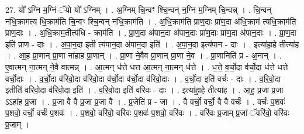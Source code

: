 \documentclass[17pt]{extarticle}
\begin{document}
27. यो᳚ ऽग्नि म॒ग्निं ॅयो यो᳚ ऽग्निम् । . अ॒ग्निम् चि॒न्वꣳ श्चि॒न्वन् न॒ग्नि म॒ग्निम् चि॒न्वन्न् । . चि॒न्वन् न॑धि॒क्राम॑त्य धि॒क्राम॑ति चि॒न्वꣳ श्चि॒न्वन् न॑धि॒क्राम॑ति । . अ॒धि॒क्राम॑ति प्राण॒दाः प्रा॑ण॒दा अ॑धि॒क्राम॑ त्यधि॒क्राम॑ति प्राण॒दाः । . अ॒धि॒क्राम॒तीत्य॑धि - क्राम॑ति । . प्रा॒ण॒दा अ॑पान॒दा अ॑पान॒दाः प्रा॑ण॒दाः प्रा॑ण॒दा अ॑पान॒दाः । . प्रा॒ण॒दा इति॑ प्राण - दाः । . अ॒पा॒न॒दा इती त्य॑पान॒दा अ॑पान॒दा इति॑ । . अ॒पा॒न॒दा इत्य॑पान - दाः । . इत्या॑हा॒हे तीत्या॑ह । . आ॒ह॒ प्रा॒णान् प्रा॒णा ना॑हाह प्रा॒णान् । . प्रा॒णा ने॒वैव प्रा॒णान् प्रा॒णा ने॒व । . प्रा॒णानिति॑ प्र - अ॒नान् । . ए॒वात्मन् ना॒त्मन् ने॒वै वात्मन्न् । . आ॒त्मन् ध॑त्ते धत्त आ॒त्मन् ना॒त्मन् ध॑त्ते । . ध॒त्ते॒ व॒र्चो॒दा व॑र्चो॒दा ध॑त्ते धत्ते वर्चो॒दाः । . व॒र्चो॒दा व॑रिवो॒दा व॑रिवो॒दा व॑र्चो॒दा व॑र्चो॒दा व॑रिवो॒दाः । . व॒र्चो॒दा इति॑ वर्चः - दाः । . व॒रि॒वो॒दा इतीति॑ वरिवो॒दा व॑रिवो॒दा इति॑ । . व॒रि॒वो॒दा इति॑ वरिवः - दाः । . इत्या॑हा॒हे तीत्या॑ह । . आ॒ह॒ प्र॒जा प्र॒जा ऽऽहा॑ह प्र॒जा । . प्र॒जा वै वै प्र॒जा प्र॒जा वै । . प्र॒जेति॑ प्र - जा । . वै वर्चो॒ वर्चो॒ वै वै वर्चः॑ । . वर्चः॑ प॒शवः॑ प॒शवो॒ वर्चो॒ वर्चः॑ प॒शवः॑ । . प॒शवो॒ वरि॑वो॒ वरि॑वः प॒शवः॑ प॒शवो॒ वरि॑वः । . वरि॑वः प्र॒जाम् प्र॒जां ॅवरि॑वो॒ वरि॑वः प्र॒जाम् । \newline
\end{document}
